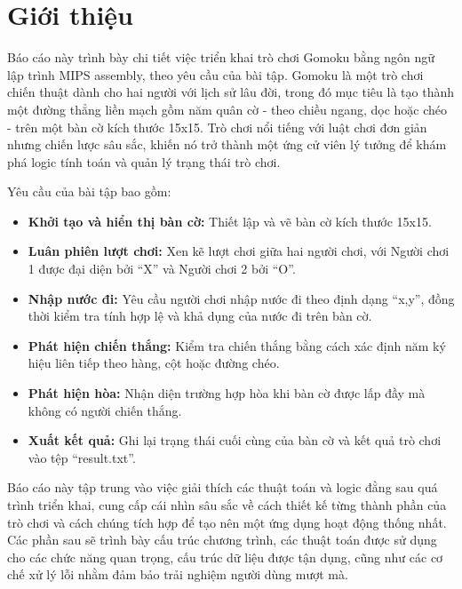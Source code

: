 \section{Giới thiệu}
Báo cáo này trình bày chi tiết việc triển khai trò chơi Gomoku bằng ngôn ngữ lập trình MIPS assembly, theo yêu cầu của bài tập. Gomoku là một trò chơi chiến thuật dành cho hai người với lịch sử lâu đời, trong đó mục tiêu là tạo thành một đường thẳng liền mạch gồm năm quân cờ - theo chiều ngang, dọc hoặc chéo - trên một bàn cờ kích thước 15x15. Trò chơi nổi tiếng với luật chơi đơn giản nhưng chiến lược sâu sắc, khiến nó trở thành một ứng cử viên lý tưởng để khám phá logic tính toán và quản lý trạng thái trò chơi.

Yêu cầu của bài tập bao gồm:
\begin{itemize}
    \item \textbf{Khởi tạo và hiển thị bàn cờ:} Thiết lập và vẽ bàn cờ kích thước 15x15.
    \item \textbf{Luân phiên lượt chơi:} Xen kẽ lượt chơi giữa hai người chơi, với Người chơi 1 được đại diện bởi “X” và Người chơi 2 bởi “O”.
    \item \textbf{Nhập nước đi:} Yêu cầu người chơi nhập nước đi theo định dạng “x,y”, đồng thời kiểm tra tính hợp lệ và khả dụng của nước đi trên bàn cờ.
    \item \textbf{Phát hiện chiến thắng:} Kiểm tra chiến thắng bằng cách xác định năm ký hiệu liên tiếp theo hàng, cột hoặc đường chéo.
    \item \textbf{Phát hiện hòa:} Nhận diện trường hợp hòa khi bàn cờ được lấp đầy mà không có người chiến thắng.
    \item \textbf{Xuất kết quả:} Ghi lại trạng thái cuối cùng của bàn cờ và kết quả trò chơi vào tệp “result.txt”.
\end{itemize}

Báo cáo này tập trung vào việc giải thích các thuật toán và logic đằng sau quá trình triển khai, cung cấp cái nhìn sâu sắc về cách thiết kế từng thành phần của trò chơi và cách chúng tích hợp để tạo nên một ứng dụng hoạt động thống nhất. Các phần sau sẽ trình bày cấu trúc chương trình, các thuật toán được sử dụng cho các chức năng quan trọng, cấu trúc dữ liệu được tận dụng, cũng như các cơ chế xử lý lỗi nhằm đảm bảo trải nghiệm người dùng mượt mà.
\pagebreak